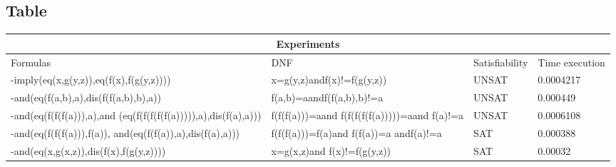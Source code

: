 \documentclass{article}
\begin{document}
\subsection{Table}
\begin{tabular}{ |p{6cm}||p{4.5cm}|p{3cm}|p{3cm}|  }
 \hline
 \multicolumn{4}{|c|}{Experiments} \\
 \hline
 Formulas & DNF &Satisfiability&Time execution\\
 \hline
 -imply(eq(x,g(y,z)),eq(f(x),f(g(y,z))))   & x=g(y,z)andf(x)!=f(g(y,z)) &UNSAT&  0.0004217\\
 -and(eq(f(a,b),a),dis(f(f(a,b),b),a))&  f(a,b)=aandf(f(a,b),b)!=a  & UNSAT   &0.000449\\
 -and(eq(f(f(f(a))),a),and (eq(f(f(f(f(f(a))))),a),dis(f(a),a))) &f(f(f(a)))=aand f(f(f(f(f(a)))))=a\space and f(a)!=a & UNSAT&  0.0006108\\
 -and(eq(f(f(f(a))),f(a)), and(eq(f(f(a)),a),dis(f(a),a))) &f(f(f(a)))=f(a)and f(f(a))=a andf(a)!=a & SAT&  0.000388\\
 -and(eq(x,g(x,z)),dis(f(x),f(g(y,z))))& x=g(x,z)and f(x)!=f(g(y,z)) & SAT&0.00032\\
 \hline
\end{tabular}
\end{document}
